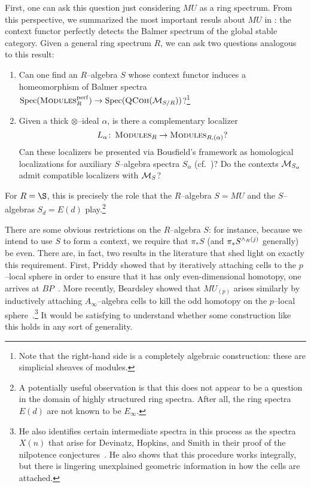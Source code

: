 First, one can ask this question just considering \(MU\) as a ring spectrum.  From this perspective, we summarized the most important resuls about \(MU\) in : the context functor perfectly detects the Balmer spectrum of the global stable category.  Given a general ring spectrum \(R\), we can ask two questions analogous to this result:
\begin{enumerate}
\item Can one find an \(R\)--algebra \(S\) whose context functor induces a homeomorphism of Balmer spectra \(\operatorname{Spec}(\normalfont\textsc{Modules}_R^{\mathrm{perf}}) \to \operatorname{Spec}(\normalfont\textsc{QCoh}(\mathcal{M}_{S/R}))\)?\footnote{Note that the right-hand side is a completely algebraic construction: these are simplicial sheaves of modules.}
\item Given a thick \(\otimes\)--ideal \(\alpha\), is there a complementary localizer \[L_\alpha\colon\thinspace \normalfont\textsc{Modules}_R \to \normalfont\textsc{Modules}_{R,(\alpha)}?\]  Can these localizers be presented via Bousfield's framework as homological localizations for auxiliary \(S\)--algebra spectra \(S_\alpha\) (cf.\ )?  Do the contexts \(\mathcal{M}_{S_\alpha}\) admit compatible localizers with \(\mathcal{M}_{S}\)?
\end{enumerate}
For \(R = \S\), this is precisely the role that the \(R\)--algebra \(S = MU\) and the \(S\)--algebras \(S_d = E(d)\) play.\footnote{A potentially useful observation is that this does not appear to be a question in the domain of highly structured ring spectra.  After all, the ring spectra \(E(d)\) are not known to be \(E_\infty\).}

There are some obvious restrictions on the \(R\)--algebra \(S\): for instance, because we intend to use \(S\) to form a context, we require that \(\pi_* S\) (and \(\pi_* S^{\wedge_R (j)}\) generally) be even.  There are, in fact, two results in the literature that shed light on exactly this requirement.  First, Priddy showed that by iteratively attaching cells to the \(p\)--local sphere in order to ensure that it has only even-dimensional homotopy, one arrives at \(BP\)~\cite{Priddy}.  More recently, Beardsley showed that \(MU_{(p)}\) arises similarly by inductively attaching \(A_\infty\)--algebra cells to kill the odd homotopy on the \(p\)--local sphere~\cite{Beardsley}.\footnote{He also identifies certain intermediate spectra in this process as the spectra \(X(n)\) that arise for Devinatz, Hopkins, and Smith in their proof of the nilpotence conjectures~\cite{DHS}.  He also shows that this procedure works integrally, but there is lingering unexplained geometric information in how the cells are attached.}  It would be satisfying to understand whether some construction like this holds in any sort of generality.

